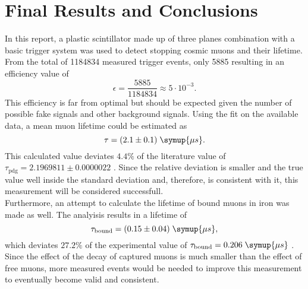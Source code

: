 \chapter{Final Results and Conclusions}
\label{sec:results}
In this report, a plastic scintillator made up of three planes combination with a basic 
trigger system was used to detect stopping cosmic muons and their lifetime. 
From the total of 1184834 measured trigger events, only 5885 resulting in an efficiency value of 
\begin{equation*}
    \epsilon = \frac{5885}{1184834} \approx 5 \cdot 10^{-3}.
\end{equation*}
This efficiency is far from optimal but should be expected given the number of possible fake signals
and other background signals. Using the fit on the available data, a mean muon lifetime could be 
estimated as 
\begin{equation*}
    \tau = (2.1 \pm 0.1) \; \symup{\mu s}.
\end{equation*}
This calculated value deviates $4.4\%$ of the literature value of $\tau_{\text{pdg}} = 2.1969811 \pm 0.0000022$ \cite{pdg}.
Since the relative deviation is smaller and the true value well inside the 
standard deviation and, therefore, is consistent with it, this measurement will be considered successfull.\\
Furthermore, an attempt to calculate the lifetime of bound muons in iron was made as well. 
The analyisis results in a lifetime of 
\begin{equation*}
    \tau_{\text{bound}} = (0.15 \pm 0.04) \; \symup{\mu s},
\end{equation*}
which deviates $27.2\%$ of the experimental value of $\tau_{\text{bound}} = 0.206 \;\symup{\mu s}$ \cite{lvd}.
Since the effect of the decay of captured muons is much smaller than the effect of free 
muons, more measured events would be needed to improve this measurement to eventually
become valid and consistent.
